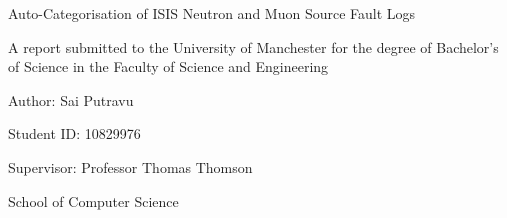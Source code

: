 \documentclass[10pt,oneside]{report}
\renewcommand{\large}{\fontsize{10}{12}\selectfont}
\begin{document}
\begin{titlepage}
    \centering
    {\fontsize{12}{14.6}\selectfont Auto-Categorisation of ISIS Neutron and Muon Source Fault Logs\\\par}
    \vspace{2cm}
    {\large A report submitted to the University of Manchester for the degree of
    Bachelor's of Science in the Faculty of Science and Engineering\par}
    \vspace{2cm}
    \vspace{1cm}

    {\large Author: Sai Putravu\par}
    {\large Student ID: 10829976\par}
    {\large Supervisor: Professor Thomas Thomson\par}
    \vfill
    {\large 2025\par}
    \vspace{1cm}
    {\large School of Computer Science\par}
\end{titlepage}

\end{document}
